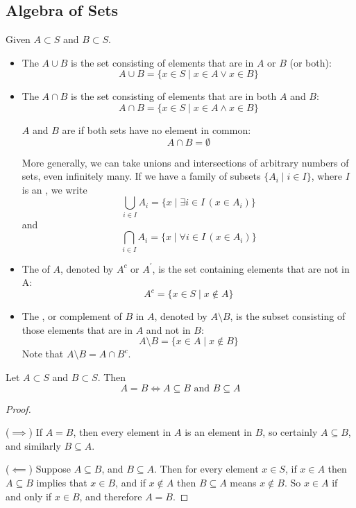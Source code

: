 \subsection{Algebra of Sets}
Given $A \subset S$ and $B \subset S$.
\begin{itemize}
\item The  $A \cup B$ is the set consisting of elements that are in $A$ or $B$ (or both):
\[ A\cup B=\{x \in S \mid x\in A \lor x\in B\} \]

\item The  $A \cap B$ is the set consisting of elements that are in both $A$ and $B$:
\[ A\cap B=\{x \in S \mid x\in A \land x\in B\} \]

$A$ and $B$ are  if both sets have no element in common:
\[ A\cap B = \emptyset \]

More generally, we can take unions and intersections of arbitrary numbers of sets, even infinitely many. If we have a family of subsets $\{A_i \mid i \in I\}$, where $I$ is an , we write
\[ \bigcup_{i\in I} A_i = \{x \mid \exists i\in I\,(x\in A_i)\} \]
and
\[ \bigcap_{i\in I} A_i = \{x \mid \forall i\in I\,(x\in A_i)\} \] 

\item The  of $A$, denoted by $A^c$ or $A^\prime$, is the set containing elements that are not in A:
\[ A^c = \{x \in S \mid x \notin A\} \]

\item The , or complement of $B$ in $A$, denoted by $A\setminus B$, is the subset consisting of those elements that are in $A$ and not in $B$:
\[ A\setminus B = \{x \in A \mid x \notin B\} \]
Note that $A\setminus B = A \cap B^c$.
\end{itemize}

\begin{proposition}
Let $A\subset S$ and $B\subset S$. Then 
\begin{equation}
A = B \iff A \subseteq B \text{ and } B \subseteq A
\end{equation}
\end{proposition}

\begin{proof} \

($\implies$) If $A = B$, then every element in $A$ is an element in $B$, so certainly $A \subseteq B$, and
similarly $B \subseteq A$. 

($\impliedby$) Suppose $A \subseteq B$, and $B \subseteq A$. Then for every element $x \in S$, if $x \in A$ then $A \subseteq B$ implies that $x \in B$, and if $x \notin A$ then $B \subseteq A$ means $x \notin B$. So $x \in A$ if and only if $x \in B$, and therefore $A = B$.
\end{proof}

